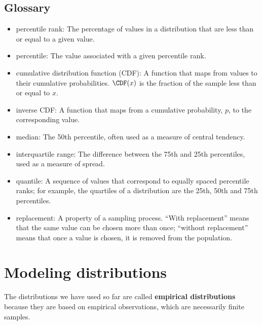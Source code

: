 \documentclass[12pt]{book}
\begin{document}
\section{Glossary}

\begin{itemize}

\item percentile rank: The percentage of values in a distribution that are
less than or equal to a given value.

\item percentile: The value associated with a given percentile rank.

\item cumulative distribution function (CDF): A function that maps
  from values to their cumulative probabilities.  $\CDF(x)$ is the
  fraction of the sample less than or equal to $x$.  

\item inverse CDF: A function that maps from a cumulative probability,
  $p$, to the corresponding value.

\item median: The 50th percentile, often used as a measure of central
  tendency.  

\item interquartile range: The difference between
the 75th and 25th percentiles, used as a measure of spread.

\item quantile: A sequence of values that correspond to equally spaced
percentile ranks; for example, the quartiles of a distribution are
the 25th, 50th and 75th percentiles.

\item replacement: A property of a sampling process. ``With replacement''
means that the same value can be chosen more than once; ``without
replacement'' means that once a value is chosen, it is removed from
the population.

\end{itemize}


\chapter{Modeling distributions}
\label{modeling}

The distributions we have used so far are called {\bf empirical
  distributions} because they are based on empirical observations,
which are necessarily finite samples.
\end{document}

